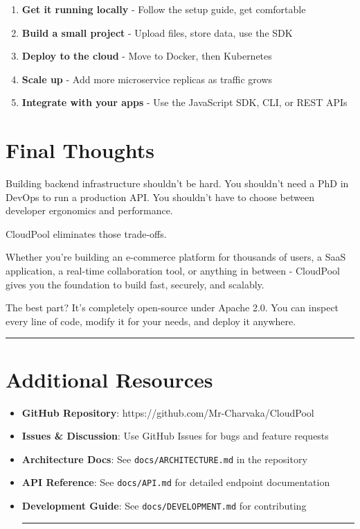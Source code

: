\documentclass[11pt,a4paper]{report}
\begin{document}
\begin{enumerate}
\item \textbf{Get it running locally} - Follow the setup guide, get comfortable
\item \textbf{Build a small project} - Upload files, store data, use the SDK
\item \textbf{Deploy to the cloud} - Move to Docker, then Kubernetes
\item \textbf{Scale up} - Add more microservice replicas as traffic grows
\item \textbf{Integrate with your apps} - Use the JavaScript SDK, CLI, or REST APIs

\end{enumerate}

\chapter{Final Thoughts}


Building backend infrastructure shouldn't be hard. You shouldn't need a PhD in DevOps to run a production API. You shouldn't have to choose between developer ergonomics and performance.

CloudPool eliminates those trade-offs.

Whether you're building an e-commerce platform for thousands of users, a SaaS application, a real-time collaboration tool, or anything in between - CloudPool gives you the foundation to build fast, securely, and scalably.

The best part? It's completely open-source under Apache 2.0. You can inspect every line of code, modify it for your needs, and deploy it anywhere.


\vfill\hrule\vfill



\chapter{Additional Resources}


\begin{itemize}
\item \textbf{GitHub Repository}: https://github.com/Mr-Charvaka/CloudPool
\item \textbf{Issues \& Discussion}: Use GitHub Issues for bugs and feature requests
\item \textbf{Architecture Docs}: See \texttt{docs/ARCHITECTURE.md} in the repository
\item \textbf{API Reference}: See \texttt{docs/API.md} for detailed endpoint documentation
\item \textbf{Development Guide}: See \texttt{docs/DEVELOPMENT.md} for contributing


\vfill\hrule\vfill


\end{itemize}
\end{document}
